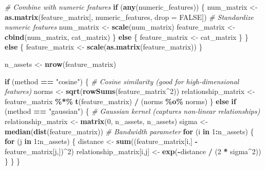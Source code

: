 \documentclass[
]{article}
\newenvironment{Shaded}{\begin{snugshade}}{\end{snugshade}}
\newcommand{\AttributeTok}[1]{\textcolor[rgb]{0.13,0.29,0.53}{#1}}
\newcommand{\CommentTok}[1]{\textcolor[rgb]{0.56,0.35,0.01}{\textit{#1}}}
\newcommand{\ConstantTok}[1]{\textcolor[rgb]{0.56,0.35,0.01}{#1}}
\newcommand{\ControlFlowTok}[1]{\textcolor[rgb]{0.13,0.29,0.53}{\textbf{#1}}}
\newcommand{\DecValTok}[1]{\textcolor[rgb]{0.00,0.00,0.81}{#1}}
\newcommand{\FunctionTok}[1]{\textcolor[rgb]{0.13,0.29,0.53}{\textbf{#1}}}
\newcommand{\NormalTok}[1]{#1}
\newcommand{\OtherTok}[1]{\textcolor[rgb]{0.56,0.35,0.01}{#1}}
\newcommand{\SpecialCharTok}[1]{\textcolor[rgb]{0.81,0.36,0.00}{\textbf{#1}}}
\newcommand{\StringTok}[1]{\textcolor[rgb]{0.31,0.60,0.02}{#1}}
\begin{document}
\begin{Shaded}
\begin{Highlighting}[]
    \CommentTok{\# Combine with numeric features}
    \ControlFlowTok{if}\NormalTok{ (}\FunctionTok{any}\NormalTok{(numeric\_features)) \{}
\NormalTok{      num\_matrix }\OtherTok{\textless{}{-}} \FunctionTok{as.matrix}\NormalTok{(feature\_matrix[, numeric\_features, }\AttributeTok{drop =} \ConstantTok{FALSE}\NormalTok{])}
      \CommentTok{\# Standardize numeric features}
\NormalTok{      num\_matrix }\OtherTok{\textless{}{-}} \FunctionTok{scale}\NormalTok{(num\_matrix)}
\NormalTok{      feature\_matrix }\OtherTok{\textless{}{-}} \FunctionTok{cbind}\NormalTok{(num\_matrix, cat\_matrix)}
\NormalTok{    \} }\ControlFlowTok{else}\NormalTok{ \{}
\NormalTok{      feature\_matrix }\OtherTok{\textless{}{-}}\NormalTok{ cat\_matrix}
\NormalTok{    \}}
\NormalTok{  \} }\ControlFlowTok{else}\NormalTok{ \{}
\NormalTok{    feature\_matrix }\OtherTok{\textless{}{-}} \FunctionTok{scale}\NormalTok{(}\FunctionTok{as.matrix}\NormalTok{(feature\_matrix))}
\NormalTok{  \}}
  
\NormalTok{  n\_assets }\OtherTok{\textless{}{-}} \FunctionTok{nrow}\NormalTok{(feature\_matrix)}
  
  \ControlFlowTok{if}\NormalTok{ (method }\SpecialCharTok{==} \StringTok{"cosine"}\NormalTok{) \{}
    \CommentTok{\# Cosine similarity (good for high{-}dimensional features)}
\NormalTok{    norms }\OtherTok{\textless{}{-}} \FunctionTok{sqrt}\NormalTok{(}\FunctionTok{rowSums}\NormalTok{(feature\_matrix}\SpecialCharTok{\^{}}\DecValTok{2}\NormalTok{))}
\NormalTok{    relationship\_matrix }\OtherTok{\textless{}{-}}\NormalTok{ feature\_matrix }\SpecialCharTok{\%*\%} \FunctionTok{t}\NormalTok{(feature\_matrix) }\SpecialCharTok{/}\NormalTok{ (norms }\SpecialCharTok{\%o\%}\NormalTok{ norms)}
\NormalTok{  \} }\ControlFlowTok{else} \ControlFlowTok{if}\NormalTok{ (method }\SpecialCharTok{==} \StringTok{"gaussian"}\NormalTok{) \{}
    \CommentTok{\# Gaussian kernel (captures non{-}linear relationships)}
\NormalTok{    relationship\_matrix }\OtherTok{\textless{}{-}} \FunctionTok{matrix}\NormalTok{(}\DecValTok{0}\NormalTok{, n\_assets, n\_assets)}
\NormalTok{    sigma }\OtherTok{\textless{}{-}} \FunctionTok{median}\NormalTok{(}\FunctionTok{dist}\NormalTok{(feature\_matrix))  }\CommentTok{\# Bandwidth parameter}
    \ControlFlowTok{for}\NormalTok{ (i }\ControlFlowTok{in} \DecValTok{1}\SpecialCharTok{:}\NormalTok{n\_assets) \{}
      \ControlFlowTok{for}\NormalTok{ (j }\ControlFlowTok{in} \DecValTok{1}\SpecialCharTok{:}\NormalTok{n\_assets) \{}
\NormalTok{        distance }\OtherTok{\textless{}{-}} \FunctionTok{sum}\NormalTok{((feature\_matrix[i,] }\SpecialCharTok{{-}}\NormalTok{ feature\_matrix[j,])}\SpecialCharTok{\^{}}\DecValTok{2}\NormalTok{)}
\NormalTok{        relationship\_matrix[i,j] }\OtherTok{\textless{}{-}} \FunctionTok{exp}\NormalTok{(}\SpecialCharTok{{-}}\NormalTok{distance }\SpecialCharTok{/}\NormalTok{ (}\DecValTok{2} \SpecialCharTok{*}\NormalTok{ sigma}\SpecialCharTok{\^{}}\DecValTok{2}\NormalTok{))}
\NormalTok{      \}}
\NormalTok{    \}}
\NormalTok{  \}}
  

\end{Highlighting}
\end{Shaded}
\end{document}
